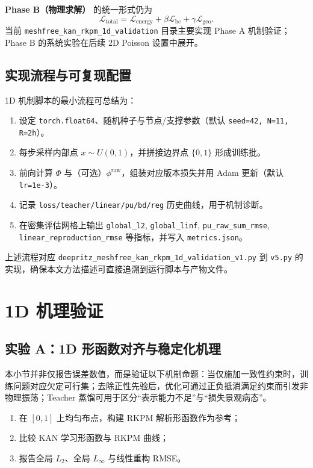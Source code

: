 ﻿\documentclass[lang=cn,a4paper]{elegantpaper}
\begin{document}
\textbf{Phase B（物理求解）} 的统一形式仍为
\begin{equation}
  \mathcal{L}_{\mathrm{total}}
  =\mathcal{L}_{\mathrm{energy}}
  +\beta\mathcal{L}_{\mathrm{bc}}
  +\gamma\mathcal{L}_{\mathrm{geo}}.
\end{equation}
当前 \texttt{meshfree\_kan\_rkpm\_1d\_validation} 目录主要实现 Phase A 机制验证；Phase B 的系统实验在后续 2D Poisson 设置中展开。

\subsection{实现流程与可复现配置}
1D 机制脚本的最小流程可总结为：
\begin{enumerate}[label=\arabic*.]
  \item 设定 \texttt{torch.float64}、随机种子与节点/支撑参数（默认 \texttt{seed=42, N=11, R=2h}）。
  \item 每步采样内部点 $x\sim U(0,1)$，并拼接边界点 $\{0,1\}$ 形成训练批。
  \item 前向计算 $\Phi$ 与（可选）$\phi^{\mathrm{raw}}$，组装对应版本损失并用 Adam 更新（默认 \texttt{lr=1e-3}）。
  \item 记录 \texttt{loss/teacher/linear/pu/bd/reg} 历史曲线，用于机制诊断。
  \item 在密集评估网格上输出 \texttt{global\_l2}, \texttt{global\_linf}, \texttt{pu\_raw\_sum\_rmse}, \texttt{linear\_reproduction\_rmse} 等指标，并写入 \texttt{metrics.json}。
\end{enumerate}
上述流程对应 \texttt{deepritz\_meshfree\_kan\_rkpm\_1d\_validation\_v1.py} 到 \texttt{v5.py} 的实现，确保本文方法描述可直接追溯到运行脚本与产物文件。

\section{1D 机理验证}
\subsection{实验 A：1D 形函数对齐与稳定化机理}
本小节并非仅报告误差数值，而是验证以下机制命题：当仅施加一致性约束时，训练问题对应欠定可行集；去除正性先验后，优化可通过正负抵消满足约束而引发非物理振荡；Teacher 蒸馏可用于区分“表示能力不足”与“损失景观病态”。
\begin{enumerate}[label=\arabic*.]
  \item 在 $[0,1]$ 上均匀布点，构建 RKPM 解析形函数作为参考；
  \item 比较 KAN 学习形函数与 RKPM 曲线；
  \item 报告全局 $L_2$、全局 $L_\infty$ 与线性重构 RMSE。
\end{enumerate}
\end{document}
